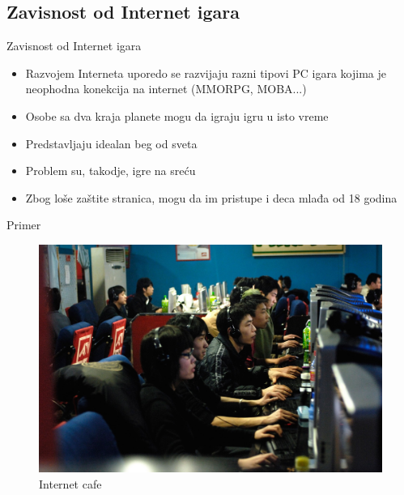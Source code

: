 \documentclass{beamer}
\begin{document}
		\subsection*{Zavisnost od Internet igara}
		\begin{frame}{Zavisnost od Internet igara}
		\begin{itemize}

			\item Razvojem Interneta uporedo se razvijaju razni tipovi PC igara kojima je neophodna konekcija na internet (MMORPG, MOBA...)
			\item Osobe sa dva kraja planete mogu da igraju igru u isto vreme
			\item Predstavljaju idealan beg od sveta
			\linebreak
			\item Problem su, takodje, igre na sreću
			\item Zbog loše zaštite stranica, mogu da im pristupe i deca mlađa od 18 godina
		\end{itemize}			
		\end{frame}
		
		\begin{frame}{Primer}
		\begin{figure}[h!]
			\begin{center}
				\includegraphics[scale=0.15]{internet_cafe.jpg}
			\end{center}
			\caption{Internet cafe}
			\label{fig:zavisnost}
		\end{figure}
		
		\end{frame}
		
\end{document}

